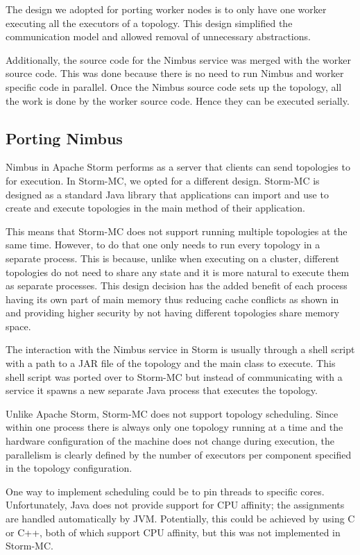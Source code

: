 The design we adopted for porting worker nodes is to only have one worker executing all the executors of a topology. This design simplified the communication model and allowed removal of unnecessary abstractions.

Additionally, the source code for the Nimbus service was merged with the worker source code. This was done because there is no need to run Nimbus and worker specific code in parallel. Once the Nimbus source code sets up the topology, all the work is done by the worker source code. Hence they can be executed serially.

\subsection{Porting Nimbus}

Nimbus in Apache Storm performs as a server that clients can send topologies to for execution. In Storm-MC, we opted for a different design. Storm-MC is designed as a standard Java library that applications can import and use to create and execute topologies in the main method of their application.

This means that Storm-MC does not support running multiple topologies at the same time. However, to do that one only needs to run every topology in a separate process. This is because, unlike when executing on a cluster, different topologies do not need to share any state and it is more natural to execute them as separate processes. This design decision has the added benefit of each process having its own part of main memory thus reducing cache conflicts as shown in \cite{Chandra:2005:PIC:1042442.1043432} and providing higher security by not having different topologies share memory space.

The interaction with the Nimbus service in Storm is usually through a shell script with a path to a JAR file of the topology and the main class to execute. This shell script was ported over to Storm-MC but instead of communicating with a service it spawns a new separate Java process that executes the topology.

Unlike Apache Storm, Storm-MC does not support topology scheduling. Since within one process there is always only one topology running at a time and the hardware configuration of the machine does not change during execution, the parallelism is clearly defined by the number of executors per component specified in the topology configuration.

One way to implement scheduling could be to pin threads to specific cores. Unfortunately, Java does not provide support for CPU affinity; the assignments are handled automatically by JVM. Potentially, this could be achieved by using C or C++, both of which support CPU affinity, but this was not implemented in Storm-MC.

